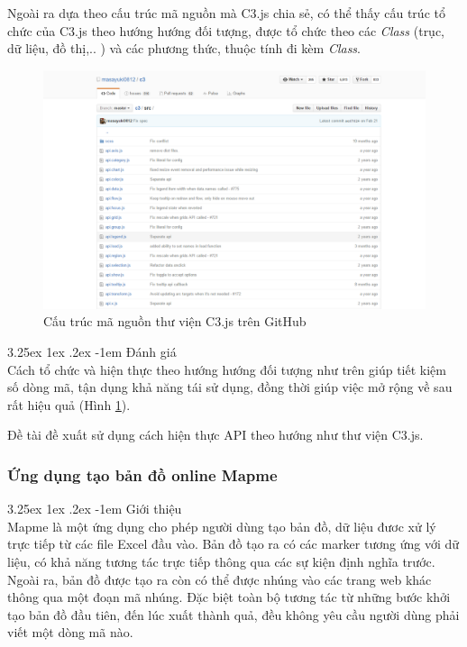 \documentclass[12pt,a4paper,twoside]{article}
\makeatletter
\newcommand{\myparagraph}[1]{\paragraph{#1}\mbox{}\\} %
\renewcommand\paragraph{\@startsection{paragraph}{5}{\z@}%
  {3.25ex \@plus1ex \@minus.2ex}%
  {-1em}%
  {\normalfont\normalsize\bfseries}}
\makeatother
\begin{document}
Ngoài ra dựa theo cấu trúc mã nguồn mà C3.js chia sẻ, có thể thấy cấu trúc tổ chức của C3.js theo hướng hướng đối tượng, được tổ chức theo các \textit{Class} (trục, dữ liệu, đồ thị,.. ) và các phương thức, thuộc tính đi kèm \textit{Class}.

\begin{figure}[!h]
	\begin{center}
    \includegraphics[scale=.4]{image/c3source}
    \caption{Cấu trúc mã nguồn thư viện C3.js trên GitHub}
    \label{fig:c3source}
	\end{center}
\end{figure}

\myparagraph{Đánh giá}
Cách tổ chức và hiện thực theo hướng hướng đối tượng như trên giúp tiết kiệm số dòng mã, tận dụng khả năng tái sử dụng, đồng thời giúp việc mở rộng về sau rất hiệu quả (Hình \ref{fig:c3source}).

Đề tài đề xuất sử dụng cách hiện thực API theo hướng như thư viện C3.js.

\subsubsection{Ứng dụng tạo bản đồ online Mapme}
\myparagraph{Giới thiệu}
Mapme\cite{mapme} là một ứng dụng cho phép người dùng tạo bản đồ, dữ liệu đươc xử lý trực tiếp từ các file Excel đầu vào. Bản đồ tạo ra có các marker tương ứng với dữ liệu, có khả năng tương tác trực tiếp thông qua các sự kiện định nghĩa trước. Ngoài ra, bản đồ được tạo ra còn có thể được nhúng vào các trang web khác thông qua một đoạn mã nhúng. Đặc biệt toàn bộ tương tác từ những bước khởi tạo bản đồ đầu tiên, đến lúc xuất thành quả, đều không yêu cầu người dùng phải viết một dòng mã nào.
\end{document}
